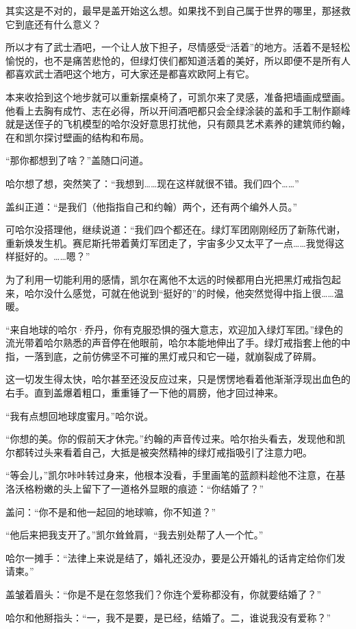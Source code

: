 \documentclass[../main]{subfiles}
\begin{document}
其实这是不对的，最早是盖开始这么想。如果找不到自己属于世界的哪里，那拯救它到底还有什么意义？

所以才有了武士酒吧，一个让人放下担子，尽情感受“活着”的地方。活着不是轻松愉悦的，也不是痛苦悲怆的，但绿灯侠们都知道活着的美好，所以即便不是所有人都喜欢武士酒吧这个地方，可大家还是都喜欢欧阿上有它。

本来收拾到这个地步就可以重新摆桌椅了，可凯尔来了灵感，准备把墙画成壁画。他看上去胸有成竹、志在必得，所以开间酒吧都只会全绿涂装的盖和手工制作巅峰就是送侄子的飞机模型的哈尔没好意思打扰他，只有颇具艺术素养的建筑师约翰，在和凯尔探讨壁画的结构和布局。

“那你都想到了啥？”盖随口问道。

哈尔想了想，突然笑了：“我想到……现在这样就很不错。我们四个\ldots\ldots”

盖纠正道：“是我们（他指指自己和约翰）两个，还有两个编外人员。”

可哈尔没搭理他，继续说道：“我们四个都还在。绿灯军团刚刚经历了新陈代谢，重新焕发生机。赛尼斯托带着黄灯军团走了，宇宙多少又太平了一点……我觉得这样挺好的。……嗯？”

为了利用一切能利用的感情，凯尔在离他不太远的时候都用白光把黑灯戒指包起来，哈尔没什么感觉，可就在他说到“挺好的”的时候，他突然觉得中指上很……温暖。

“来自地球的哈尔·乔丹，你有克服恐惧的强大意志，欢迎加入绿灯军团。”绿色的流光带着哈尔熟悉的声音停在他眼前，哈尔本能地伸出了手。绿灯戒指套上他的中指，一落到底，之前仿佛坚不可摧的黑灯戒只和它一碰，就崩裂成了碎屑。

这一切发生得太快，哈尔甚至还没反应过来，只是愣愣地看着他渐渐浮现出血色的右手。直到盖爆着粗口，重重锤了一下他的肩膀，他才回过神来。

“我有点想回地球度蜜月。”哈尔说。

“你想的美。你的假前天才休完。”约翰的声音传过来。哈尔抬头看去，发现他和凯尔都转过头来看着自己，大抵是被突然精神的绿灯戒指吸引了注意力吧。

“等会儿，”凯尔咔咔转过身来，他根本没看，手里画笔的蓝颜料趁他不注意，在基洛沃格粉嫩的头上留下了一道格外显眼的痕迹：“你结婚了？”

盖问：“你不是和他一起回的地球嘛，你不知道？”

“他后来把我支开了。”凯尔耸耸肩，“我去别处帮了人一个忙。”

哈尔一摊手：“法律上来说是结了，婚礼还没办，要是公开婚礼的话肯定给你们发请柬。”

盖皱着眉头：“你是不是在忽悠我们？你连个爱称都没有，你就要结婚了？”

哈尔和他掰指头：“一，我不是要，是已经，结婚了。二，谁说我没有爱称？”
\end{document}
